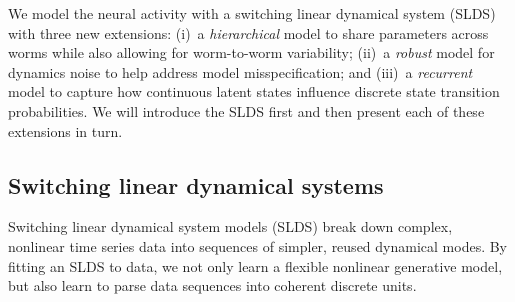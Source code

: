 \documentclass{article}
\begin{document}
We model the neural activity with a switching linear
dynamical system (SLDS) with three new extensions: (i)~a \emph{hierarchical} model
to share parameters across worms while also allowing for worm-to-worm
variability; (ii)~a \emph{robust} model for dynamics noise to help address
model misspecification; and (iii)~a \emph{recurrent} model to capture
how continuous latent states influence discrete state transition probabilities.
We will introduce the SLDS first and then present each of these extensions
in turn.


\subsection{Switching linear dynamical systems}
\label{sec:slds}
Switching linear dynamical system models (SLDS) break down complex, nonlinear
time series data into sequences of simpler, reused dynamical modes.
By fitting an SLDS to data, we not only learn a flexible nonlinear generative
model, but also learn to parse data sequences into coherent discrete units.
\end{document}
